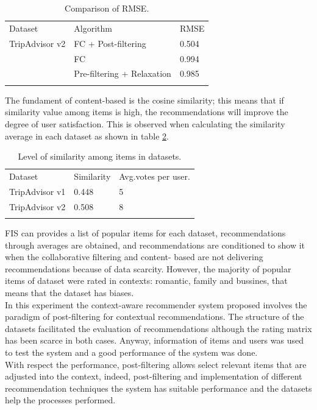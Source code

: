 \begin{table}
\centering
\small
\captionsetup{font=footnotesize}
\caption{Comparison of RMSE.}
\label{tab:4}  
\small   
\begin{tabular}{lll}
\hline\noalign{\smallskip}
Dataset & Algorithm & RMSE \\
\noalign{\smallskip}\hline\noalign{\smallskip}
TripAdvisor v2 & FC + Post-filtering  & 0.504  \\
               & FC          & 0.994  \\
               & Pre-filtering + Relaxation & 0.985  \\
\noalign{\smallskip}\hline
\end{tabular}
\end{table}
The fundament of content-based is the cosine similarity; this means
that if similarity value among items is high, the recommendations will
improve the degree of user satisfaction. This is observed when
calculating the similarity average in each dataset as shown in table
\ref{tab:5}.
\begin{table}
\centering
\small
\captionsetup{font=footnotesize}
\caption{Level of similarity among items in datasets. }
\label{tab:5}      
\begin{tabular}{lll}
\hline\noalign{\smallskip}
Dataset  & Similarity  & Avg.votes per user. \\
\noalign{\smallskip}\hline\noalign{\smallskip}
TripAdvisor v1 & 0.448  & 5  \\
TripAdvisor v2 & 0.508  & 8  \\
\noalign{\smallskip}\hline
\end{tabular}
\end{table}
FIS can provides a list of popular items for each dataset,
recommendations through averages are obtained, and recommendations are
conditioned to show it when the collaborative filtering and content-
based are not delivering recommendations because of data scarcity.
However, the majority of popular items of dataset were rated in contexts: romantic, family and bussines, that means that the dataset has
biases.\\  In this experiment  the context-aware recommender system
proposed involves the paradigm of post-filtering for contextual
recommendations. The structure of the datasets facilitated the
evaluation of recommendations although the rating matrix has been
scarce in both cases. Anyway, information of items and users was used
to test the system and a good performance of the system was done.\\   
With respect the performance, post-filtering allows select relevant
items that are adjusted into the context, indeed, post-filtering and
implementation of different recommendation techniques the system has
suitable performance and the datasets help the processes performed.

